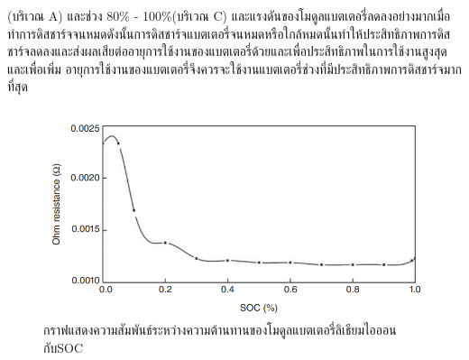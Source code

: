 (บริเวณ A) และช่วง 80\% - 100\%(บริเวณ C) และแรงดันของโมดูลแบตเตอรี่ลดลงอย่างมากเมื่อทำการดิสชาร์จจนหมดดังนั้นการดิสชาร์จแบตเตอรี่จนหมดหรือใกล้หมดนั้นทำให้ประสิทธิภาพการดิสชาร์จลดลงและส่งผลเสียต่ออายุการใช้งานของแบตเตอรี่ด้วยและเพื่อประสิทธิภาพในการใช้งานสูงสุดและเพื่อเพิ่ม
อายุการใช้งานของแบตเตอรี่จึงควรจะใช้งานแบตเตอรี่ช่วงที่มีประสิทธิภาพการดิสชาร์จมากที่สุด\newline
\begin{center}
	\begin{figure}[!h]
		\includegraphics[width=0.6\linewidth]{Chapters/img/Resistance_vs_SOC.png}
			\centering
			\captionsetup{justification=centering,margin=2cm}
			\caption{กราฟแสดงความสัมพันธ์ระหว่างความต้านทานของโมดูลแบตเตอรี่ลิเธียมไอออนกับSOC}
	\end{figure}
\end{center}
